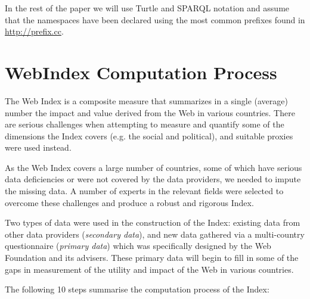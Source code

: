 \documentclass{llncs}
\begin{document}

In the rest of the paper we will use Turtle and SPARQL notation and assume that the namespaces have been declared using the most common prefixes found in
\url{http://prefix.cc}.

\section{WebIndex Computation Process}

The Web Index is a composite measure that summarizes in a single (average) number the impact and value derived from the Web in various countries. There are serious challenges when attempting to measure and quantify some of the dimensions the Index covers (e.g. the social and political), and suitable proxies were used instead.

As the Web Index covers a large number of countries, some of which have serious data deficiencies or were not covered by the data providers, we needed to impute the missing data. 
A number of experts in the relevant fields were selected to overcome these challenges and 
produce a robust and rigorous Index.

Two types of data were used in the construction of the Index: existing data from other data providers (\emph{secondary data}), and new data gathered via a multi-country questionnaire (\emph{primary data}) 
which was specifically designed by the Web Foundation and its advisers. 
These primary data will begin to fill in some of the gaps in measurement of the utility and impact of the Web in various countries. 

The following 10 steps summarise the computation process of the Index:
\end{document}
